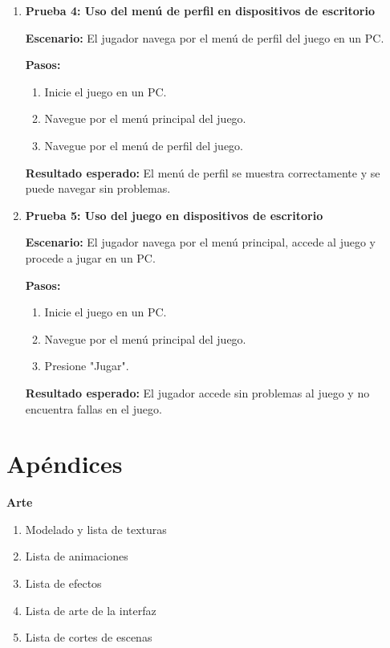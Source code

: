 \begin{enumerate}
	\item \textbf{Prueba 4: Uso del menú de perfil en dispositivos de escritorio}

	      \textbf{Escenario:} El jugador navega por el menú de perfil del juego en un PC.

	      \textbf{Pasos:}
	      \begin{enumerate}
		      \item Inicie el juego en un PC.
		      \item Navegue por el menú principal del juego.
		      \item Navegue por el menú de perfil del juego.
	      \end{enumerate}

	      \textbf{Resultado esperado:} El menú de perfil se muestra correctamente y se puede navegar sin problemas.

	\item \textbf{Prueba 5: Uso del juego en dispositivos de escritorio}

	      \textbf{Escenario:} El jugador navega por el menú principal, accede al juego y procede a jugar en un PC.

	      \textbf{Pasos:}
	      \begin{enumerate}
		      \item Inicie el juego en un PC.
		      \item Navegue por el menú principal del juego.
		      \item Presione "Jugar".
	      \end{enumerate}

	      \textbf{Resultado esperado:} El jugador accede sin problemas al juego y no encuentra fallas en el juego.

\end{enumerate}

\section{Apéndices}
\textbf{Arte}

\begin{enumerate}
	\item Modelado y lista de texturas
	\item Lista de animaciones
	\item Lista de efectos
	\item Lista de arte de la interfaz
	\item Lista de cortes de escenas
\end{enumerate}

